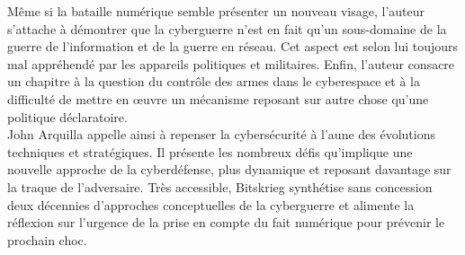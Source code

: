 \documentclass[a4paper]{article}
\begin{document}
Même si la bataille numérique semble présenter un nouveau visage, l’auteur s’attache à démontrer que la cyberguerre n’est en fait qu’un sous-domaine de la guerre de l’information et de la guerre en réseau. Cet aspect est selon lui toujours mal appréhendé par les appareils politiques et militaires. Enfin, l’auteur consacre un chapitre à la question du contrôle des armes dans le cyberespace et à la difficulté de mettre en œuvre un mécanisme reposant sur autre chose qu’une politique déclaratoire.
\\

John Arquilla appelle ainsi à repenser la cybersécurité à l’aune des évolutions techniques et stratégiques. Il présente les nombreux défis qu’implique une nouvelle approche de la cyberdéfense, plus dynamique et reposant davantage sur la traque de l’adversaire. Très accessible, Bitskrieg synthétise sans concession deux décennies d’approches conceptuelles de la cyberguerre et alimente la réflexion sur l’urgence de la prise en compte du fait numérique pour prévenir le prochain choc.
\end{document}

